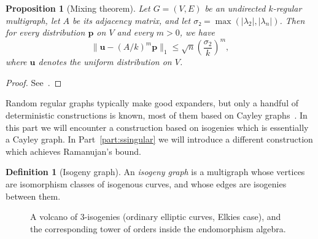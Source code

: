 \documentclass[10pt]{article}
\theoremstyle{plain}
\newtheorem{proposition}[theorem]{Proposition}
\theoremstyle{definition}
\newtheorem{definition}[theorem]{Definition}
\DeclareMathOperator{\End}{End} %
\def\O{\ensuremath{\mathcal{O}}}
\begin{document}
\begin{proposition}[Mixing theorem]
  \label{th:mixing}
  Let $G=(V,E)$ be an undirected $k$-regular multigraph, let $A$ be
  its adjacency matrix, and let $σ₂ = \max(|λ_2|, |λ_n|)$.  %
  Then for every distribution $\mathbf{p}$ on $V$ and every $m>0$, we
  have
  \begin{equation*}
    \| \mathbf{u} - (A/k)^m \mathbf{p} \|_1 ≤ \sqrt{n} \left(\frac{σ_2}{k}\right)^m,
  \end{equation*}
  where $\mathbf{u}$ denotes the uniform distribution on $V$.
\end{proposition}
\begin{proof}
  See~\cite[Chap.~21]{trevisan-graphs}.
\end{proof}

Random regular graphs typically make good expanders, but only a
handful of deterministic constructions is known, most of them based on
Cayley
graphs~\cite{LubPS,chung1989diameters,Goldreich2011,trevisan-graphs}. %
In this part we will encounter a construction based on isogenies which
is essentially a Cayley graph. %
In Part~\ref{part:ssingular} we will introduce a different
construction which achieves Ramanujan's bound.

\begin{definition}[Isogeny graph]
  An \emph{isogeny graph} is a multigraph whose vertices are
  isomorphism classes of isogenous curves, and whose edges are
  isogenies between them.
\end{definition}


\begin{figure}
  \centering
  
    \caption{A volcano of $3$-isogenies (ordinary elliptic curves,
      Elkies case), and the corresponding tower of orders inside the
      endomorphism algebra.}
  \label{fig:volcano}
\end{figure}
\end{document}
